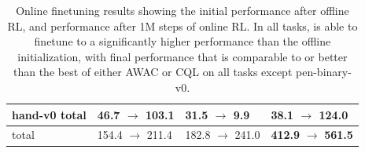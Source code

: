 \begin{table}[!htp]
\begin{tabular}{ l ||p{2.7cm} |p{2.7cm} | p{2.7cm}  }
    hand-v0 total & \textbf{46.7}  $\rightarrow$ 103.1 & 31.5  $\rightarrow$ 9.9 & 38.1  $\rightarrow$ \textbf{124.0} \\ \hline \hline
    total & 154.4 $\rightarrow$ 211.4 & 182.8 $\rightarrow$ 241.0 & \textbf{412.9} $\rightarrow$ \textbf{561.5}
\end{tabular}
\captionsetup{justification=justified,format=plain}
\caption{Online finetuning results showing the initial performance after offline RL, and performance after 1M steps of online RL. In all tasks, \ourname is able to finetune to a significantly higher performance than the offline initialization, with final performance that is comparable to or better than the best of either AWAC or CQL on all tasks except pen-binary-v0.}
\label{tab:finetuning}
 \end{table}

